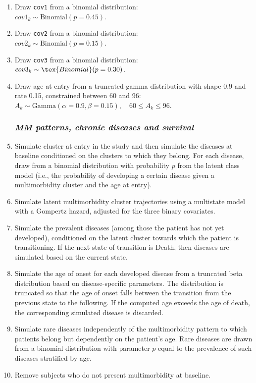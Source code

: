 \documentclass[
]{article}
\begin{document}
\begin{enumerate}
\def\labelenumi{\arabic{enumi}.}
\item
  Draw \texttt{cov1} from a binomial distribution:\\
  \(cov1_k \sim \text{Binomial}(p=0.45)\).
\item
  Draw \texttt{cov2} from a binomial distribution:\\
  \(cov2_k \sim \text{Binomial}(p=0.15)\).
\item
  Draw \texttt{cov3} from a binomial distribution:\\
  \(cov3_k \sim \tex{Binomial}(p=0.30)\).
\item
  Draw age at entry from a truncated gamma distribution with shape 0.9
  and rate 0.15, constrained between 60 and 96:\\
  \(A_k \sim \text{Gamma}(\alpha = 0.9, \beta = 0.15), \quad 60 \leq A_k \leq 96\).

  \hypertarget{mm-patterns-chronic-diseases-and-survival}{%
  \subsubsection{\texorpdfstring{\textbf{\emph{MM patterns, chronic
  diseases and
  survival}}}{MM patterns, chronic diseases and survival}}\label{mm-patterns-chronic-diseases-and-survival}}
\item
  Simulate cluster at entry in the study and then simulate the diseases
  at baseline conditioned on the clusters to which they belong. For each
  disease, draw from a binomial distribution with probability \(p\) from
  the latent class model (i.e., the probability of developing a certain
  disease given a multimorbidity cluster and the age at entry).
\item
  Simulate latent multimorbidity cluster trajectories using a multistate
  model with a Gompertz hazard, adjusted for the three binary
  covariates.
\item
  Simulate the prevalent diseases (among those the patient has not yet
  developed), conditioned on the latent cluster towards which the
  patient is transitioning. If the next state of transition is Death,
  then diseases are simulated based on the current state.
\item
  Simulate the age of onset for each developed disease from a truncated
  beta distribution based on disease-specific parameters. The
  distribution is truncated so that the age of onset falls between the
  transition from the previous state to the following. If the computed
  age exceeds the age of death, the corresponding simulated disease is
  discarded.
\item
  Simulate rare diseases independently of the multimorbidity pattern to
  which patients belong but dependently on the patient's age. Rare
  diseases are drawn from a binomial distribution with parameter \(p\)
  equal to the prevalence of such diseases stratified by age.
\item
  Remove subjects who do not present multimorbidity at baseline.


\end{enumerate}
\end{document}
